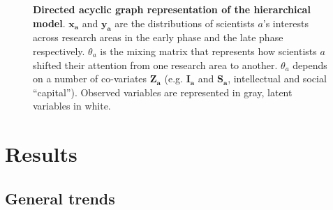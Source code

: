\documentclass{article}
\begin{document}
\begin{figure}
    \centering
    \caption{\textbf{Directed acyclic graph representation of the hierarchical model}. $\bm{x_a}$ and $\bm{y_a}$ are the distributions of scientists $a$'s interests across research areas in the early phase and the late phase respectively. $\theta_a$ is the mixing matrix that represents how scientists $a$ shifted their attention from one research area to another. $\theta_a$ depends on a number of co-variates $\bm{Z_a}$ (e.g. $\bm{I_a}$ and $\bm{S_a}$, intellectual and social ``capital''). Observed variables are represented in gray, latent variables in white.}
    \label{fig:model_structure}
\end{figure}

 \section{\label{sec:results}Results}

 \subsection{\label{sec:macro}General trends}
\end{document}
